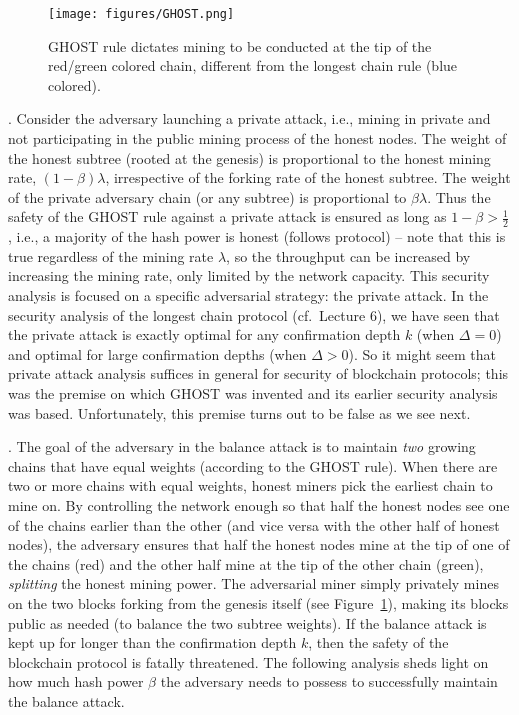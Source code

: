 \documentclass{article}
\begin{document}
\begin{figure}
 \centering
 \texttt{[image: figures/GHOST.png]}
\caption{{\sf GHOST} rule dictates mining to be conducted at the tip of the red/green colored chain, different from the longest chain rule (blue colored).  }
\label{fig:ghostillustration}
\end{figure}

. Consider the adversary launching a private attack, i.e., mining in private and not participating in the public mining process of the honest nodes. The weight of the honest subtree (rooted at the genesis) is proportional to the honest mining rate, $(1-\beta)\lambda$, irrespective of the forking rate of the honest subtree. The weight of the private adversary chain (or any subtree) is proportional to $\beta \lambda$. Thus the safety of the {\sf GHOST} rule against a private attack is ensured as long as  $1-\beta > \frac{1}{2}$, i.e., a majority of the hash power is honest (follows protocol) -- note that this is true regardless of the mining rate $\lambda$, so the throughput can be increased by increasing the mining rate, only limited by the network capacity. This security analysis is focused on a specific adversarial strategy: the private attack. In the  security analysis of the longest chain protocol (cf.\ Lecture 6), we have seen that the private attack is exactly optimal for any confirmation depth $k$ (when $\Delta = 0$) and  optimal for large confirmation depths (when $\Delta > 0$). So it might seem that private attack analysis suffices in general for security of blockchain protocols; this was the premise on which {\sf GHOST} was invented and its earlier security analysis was based. Unfortunately, this premise turns out to be false as we see next. 

.  The goal of the adversary in the balance attack is to maintain {\em two} growing chains that have equal weights (according to the {\sf GHOST} rule).  When there are two or more  chains with equal weights, honest miners pick the earliest chain to mine on. By controlling the network enough so that half the honest nodes see one of the chains earlier than the other (and vice versa with the other half of honest nodes), the adversary ensures that half the honest nodes mine at the tip of one of the chains (red) and the other half mine at the tip of the other chain (green), {\em splitting} the honest mining power. The adversarial miner simply privately mines on the two  blocks forking from the genesis itself (see Figure~\ref{fig:ghostillustration}), making its blocks  public as needed (to balance the two subtree weights). 
If the balance attack is kept up for longer than the confirmation depth $k$,  then the safety of the blockchain protocol is fatally threatened. The following analysis sheds light on how much hash power $\beta$ the adversary needs to possess to successfully maintain the balance attack. 
\end{document}
